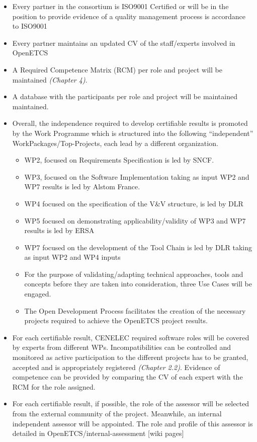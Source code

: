 \documentclass{template/openetcs_article}
\begin{document}
\begin{itemize}
\item Every partner in the consortium is ISO9001 Certified or will be in the position to provide evidence of a quality management process is accordance to ISO9001
\item Every partner maintains an updated CV of the staff/experts involved in OpenETCS
\item A Required Competence Matrix (RCM) per role and project will be maintained \textit{(Chapter 4)}.
\item A database with the participants per role and project will be maintained maintained.
\item Overall, the independence required to develop certifiable results is promoted by the Work Programme which is structured into the following “independent” WorkPackages/Top-Projects, each lead by a different organization.  
\begin{itemize}
\item WP2, focused on Requirements Specification is led by SNCF.
\item WP3, focused on the Software Implementation taking as input WP2 and WP7 results is led by Alstom France.
\item WP4 focused on the specification of the V\&V structure, is led by DLR
\item WP5 focused on demonstrating applicability/validity of WP3 and WP7 results is led by ERSA
\item WP7 focused on the development of the Tool Chain is led by DLR taking as input WP2 and WP4 inputs
\item For the purpose of validating/adapting technical approaches, tools and concepts before they are taken into consideration, three Use Cases will be engaged.
\item The Open Development Process facilitates the creation of the necessary projects required to achieve the OpenETCS project results.
\end{itemize}
\item For each certifiable result, CENELEC required software roles will be covered by experts from different WPs. Incompatibilities can be controlled and monitored as active participation to the different projects has to be granted, accepted and is appropriately registered  \textit{(Chapter 2.2)}. Evidence of competence can be provided by comparing the CV of each expert with the RCM for the role assigned.
\item For each certifiable result, if possible, the role of the assessor will be selected from the external community of the project. Meanwhile, an internal independent assessor will be appointed. The role and profile of this assessor is detailed in \citep{IA} OpenETCS/internal-assessment [wiki pages]
\end{itemize}
\end{document}
